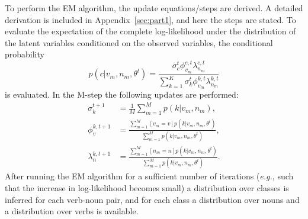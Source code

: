 \documentclass[11pt]{scrartcl}
\newcommand{\thetaold}{\theta^{t}}
\begin{document}
To perform the EM algorithm, the update equations/steps are derived. A
detailed derivation is included in Appendix~\ref{sec:part1}, and here
the steps are stated. To evaluate the expectation of the complete
log-likelihood under the distribution of the latent variables
conditioned on the observed variables, the conditional probability
\[
  p(c | v_m, n_m , \theta^t) = \frac{\sigma^t_c \phi^{c,t}_{v_m}\lambda^{c, t}_{n_m}} {\sum_{k=1}^K \sigma^t_k \phi^{k,t}_{v_m}\lambda^{k, t}_{n_m}}
\]
is evaluated. In the M-step the following updates are performed:
 \begin{align*}
     \sigma_k^{t+1} &= \frac{1}{M} \sum_{m=1}^M p(k|v_m, n_m), \\
     \phi_v^{k,t+1} &= \frac{\sum_{m=1}^M [v_m = v] p(k|v_m, n_m, \thetaold)}
                     {\sum_{m=1}^M p(k|v_m, n_m, \thetaold)}, \\
     \lambda_n^{k,t+1} &= \frac{\sum_{m=1}^M [n_m = n] p(k|v_m, n_m, \thetaold)}
                     {\sum_{m=1}^M p(k|v_m, n_m, \thetaold)}.
 \end{align*}
 After running the EM algorithm for a sufficient number of iterations
 (\textit{e.g.}, such that the increase in log-likelihood becomes small)
 a distribution over classes is inferred for each verb-noun pair, and
 for each class a distribution over nouns and a distribution over
 verbs is available.
\end{document}
